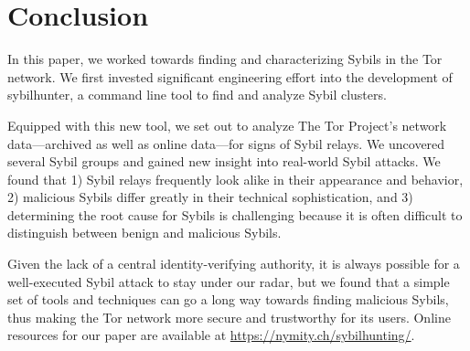 \section{Conclusion}
\label{sec:conclusion}
In this paper, we worked towards finding and characterizing Sybils in the Tor
network.  We first invested significant engineering effort into the development
of sybilhunter, a command line tool to find and analyze Sybil clusters.

Equipped with this new tool, we set out to analyze The Tor Project's network
data---archived as well as online data---for signs of Sybil relays.  We
uncovered several Sybil groups and gained new insight into real-world Sybil
attacks.  We found that 1) Sybil relays frequently look alike in their
appearance and behavior, 2) malicious Sybils differ greatly in their technical
sophistication, and 3) determining the root cause for Sybils is challenging
because it is often difficult to distinguish between benign and malicious
Sybils.


Given the lack of a central identity-verifying authority, it is always possible
for a well-executed Sybil attack to stay under our radar, but we found that a
simple set of tools and techniques can go a long way towards finding malicious
Sybils, thus making the Tor network more secure and trustworthy for its users.
Online resources for our paper are available at
\url{https://nymity.ch/sybilhunting/}.
